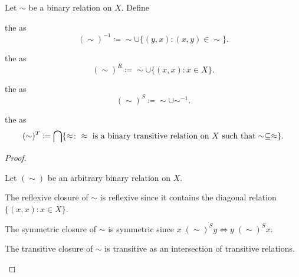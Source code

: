 \begin{definition}\label{def:derived_relations}
  Let \( \sim \) be a binary relation on \( X \). Define
  \begin{defenum}
     the  as
    \begin{equation*}
      (\sim)^{-1} \coloneqq \sim \cup \{ (y, x) \colon (x, y) \in \sim \}.
    \end{equation*}

     the  as
    \begin{equation*}
      (\sim)^R \coloneqq \sim \cup \{ (x, x) \colon x \in X \}.
    \end{equation*}

     the  as
    \begin{equation*}
      (\sim)^S \coloneqq \sim \cup \sim^{-1}.
    \end{equation*}

     the  as
    \begin{equation*}
      (\sim)^T \coloneqq \bigcap \{ \approx \colon \approx \text{ is a binary transitive relation on \( X \) such that} \sim \subseteq \approx \}.
    \end{equation*}
  \end{defenum}
\end{definition}
\begin{proof}
\begin{itemize}
  Let \( (\sim) \) be an arbitrary binary relation on \( X \).

  \begin{description}
     The reflexive closure of \( \sim \) is reflexive since it contains the diagonal relation \( \{ (x, x) \colon x \in X \} \).

     The symmetric closure of \( \sim \) is symmetric since \( x \;(\sim)^S y \iff y \;(\sim)^S x \).

     The transitive closure of \( \sim \) is transitive as an intersection of transitive relations.
  \end{description}
\end{itemize}
\end{proof}
